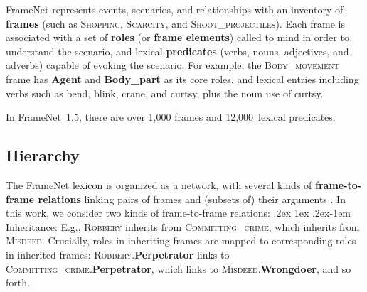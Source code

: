 \documentclass[11pt,a4paper]{article}
\makeatletter
\newcommand{\ensuretext}[1]{#1}
\newcommand{\nssmarker}{\ensuretext{\textcolor{magenta}{\ensuremath{^{\textsc{NS}}_{\textsc{S}}}}}}
\newcommand{\arkcomment}[3]{\ensuretext{\textcolor{#3}{[#1 #2]}}}
\newcommand{\nss}[1]{\arkcomment{\nssmarker}{#1}{magenta}}
\renewcommand{\paragraph}{%
  \@startsection{paragraph}{4}%
  {\z@}{.2ex \@plus 1ex \@minus .2ex}{-1em}%
  {\normalfont\normalsize\bfseries}%
}
\newcommand{\fnf}[1]{\textsc{\textsf{#1}}} %
\newcommand{\fnr}[1]{\textbf{\textsf{#1}}} %
\newcommand{\fnlu}[1]{\textsf{#1}} %
\newcommand{\finalversion}[1]{}
\makeatother
\begin{document}


FrameNet represents events, scenarios, and relationships 
with an inventory of \textbf{frames} (such as \fnf{Shopping}, \fnf{Scarcity}, and \fnf{Shoot\_projectiles}). 
Each frame is associated with a set of \textbf{roles} (or \textbf{frame elements}) 
called to mind in order to understand the scenario,
and lexical \textbf{predicates} (verbs, nouns, adjectives, and adverbs) capable of 
evoking the scenario. 
For example, the \fnf{Body\_movement} frame has \fnr{Agent} and \fnr{Body\_part} as its core roles, 
and lexical entries including verbs such as \fnlu{bend}, \fnlu{blink}, \fnlu{crane}, and \fnlu{curtsy}, 
plus the noun use of \fnlu{curtsy}.
\finalversion{
In the annotated sentence in \cref{fig:harbor-fn},
\fnf{Body\_movement} is evoked by \textit{crane}, and 3~of its roles are filled by overt arguments: 
the 2~core roles (\fnr{Agent}, \fnr{Body\_part}) happen to be filled by noun phrases 
(\textit{passengers}, \textit{their necks}), while the non-core role \fnr{Purpose} is filled by a 
prepositional phrase adjunct (\textit{for dizzying glimpses of the harbor}).
}
In FrameNet~1.5, there are over 1,000 frames and 12,000~lexical predicates.



\subsection{Hierarchy}

The FrameNet lexicon is organized as a network, with several kinds of \textbf{frame-to-frame relations} 
linking pairs of frames and (subsets of) their arguments \citep{ruppenhofer-10}. 
In this work, we consider two kinds of frame-to-frame relations:
\paragraph{Inheritance:} 
E.g., \fnf{Robbery} inherits from \fnf{Committing\_crime}, which inherits from \fnf{Misdeed}. 
Crucially, roles in inheriting frames are mapped to corresponding roles in inherited frames: \fnf{Robbery}.\fnr{Perpetrator} links to
\fnf{Committing\_crime}.\fnr{Perpetrator}, which links to \fnf{Misdeed}.\fnr{Wrongdoer}, and so forth.
\end{document}

